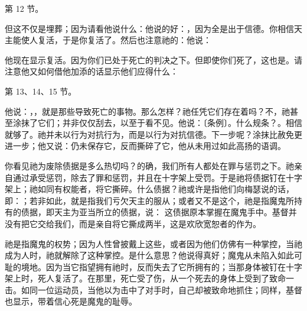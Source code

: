 第 12 节。\par

但这不仅是埋葬；因为请看他说什么：他说的好：，因为全是出于信德。你相信天主能使人复活，于是你复活了。然后也注意祂的：他说：\par

他现在显示复活。因为你们已处于死亡的判决之下。但即使你们死了，这也是。请注意他又如何借他加添的话显示他们应得什么：\par

第 13、14、15 节。\par

他说：，，就是那些导致死亡的事物。那么怎样？祂任凭它们存在着吗？不，祂甚至涂抹了它们；并非仅仅刮去，以至于看不见。他说：〔条例〕。什么规条？。相信就够了。祂并未以行为对抗行为，而是以行为对抗信德。下一步呢？涂抹比赦免更进一步；他又说：仍未保存它，反而撕碎了它，他从未用过如此高扬的语调。\par

你看见祂为废除债据是多么热切吗？的确，我们所有人都处在罪与惩罚之下。祂亲自通过承受惩罚，除去了罪和惩罚，并且在十字架上受罚。于是祂将债据钉在十字架上；祂如同有权能者，将它撕碎。什么债据？祂或许是指他们向梅瑟说的话，即：；若非如此，就是指我们亏欠天主的服从；或者又不是这个，祂是指魔鬼所持有的债据，即天主为亚当所立的债据，说： 这债据原本掌握在魔鬼手中。基督并没有把它交给我们，而是亲自将它撕成两半，这是欢欣宽恕者的作为。\par

祂是指魔鬼的权势；因为人性曾披戴上这些，或者因为他们仿佛有一种掌控，当祂成为人时，祂就解除了这种掌控。是什么意思？他说得真好；魔鬼从未陷入如此可耻的境地。因为当它指望拥有祂时，反而失去了它所拥有的；当那身体被钉在十字架上时，死人复活了。在那里，死亡受了伤，从一个死去的身体上受到了致命一击。如同一位运动员，当他以为击中了对手时，自己却被致命地抓住；同样，基督也显示，带着信心死是魔鬼的耻辱。\par

